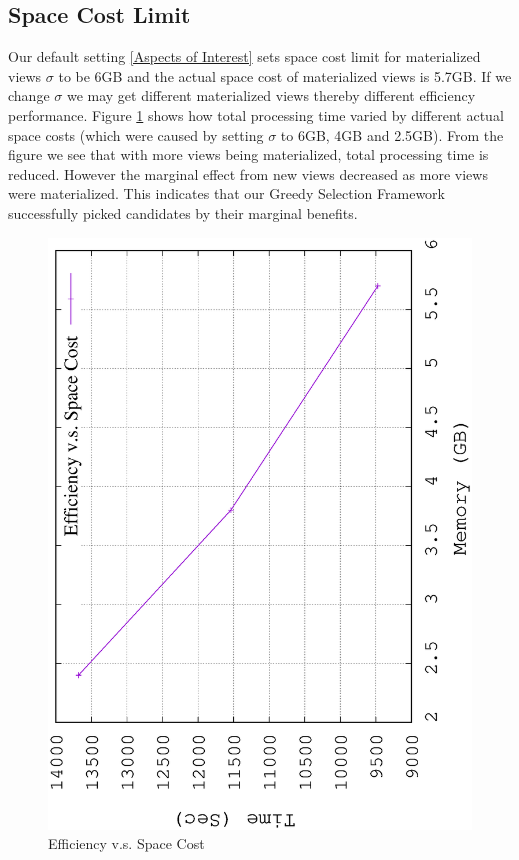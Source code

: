 \subsection{Space Cost Limit}
Our default setting \ref{Aspects of Interest} sets space cost limit for materialized views $\sigma$ to be 6GB and the actual space cost of materialized views is 5.7GB. If we change $\sigma$ we may get different materialized views thereby different efficiency performance. Figure \ref{fig:limit} shows how total processing time varied by different actual space costs (which were caused by setting $\sigma$ to 6GB, 4GB and 2.5GB). From the figure we see that with more views being materialized, total processing time is reduced. However the marginal effect from new views decreased as more views were materialized. This indicates that our Greedy Selection Framework successfully picked candidates by their marginal benefits.

\begin{figure}[H]
	\centering
	\includegraphics[scale=0.5, angle=270]{plot/limit.eps}
	\caption{Efficiency v.s. Space Cost}
	\label{fig:limit}
\end{figure}

